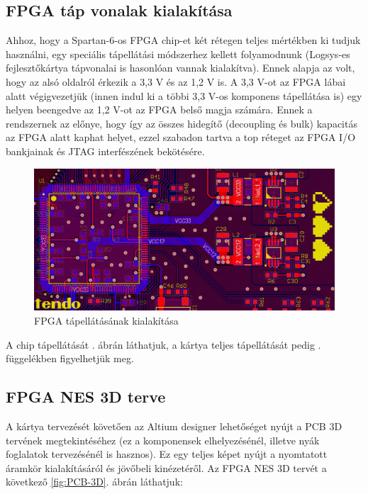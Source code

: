 	\subsection{FPGA táp vonalak kialakítása}
	
	Ahhoz, hogy a Spartan-6-os FPGA chip-et két rétegen teljes mértékben ki tudjuk használni, egy speciális tápellátási módszerhez kellett folyamodnunk (Logsys-es fejlesztőkártya tápvonalai is hasonlóan vannak kialakítva). Ennek alapja az volt, hogy az alsó oldalról érkezik a 3,3 V és az 1,2 V is. A 3,3 V-ot az FPGA lábai alatt végigvezetjük (innen indul ki a többi 3,3 V-os komponens tápellátása is) egy helyen beengedve az 1,2 V-ot az FPGA belső magja számára. Ennek a rendszernek az előnye, hogy így az összes hidegítő (decoupling és bulk) kapacitás az FPGA alatt kaphat helyet, ezzel szabadon tartva a top réteget az FPGA I/O bankjainak és JTAG interfészének bekötésére.
	
	\begin{figure}[H]
		\centering
		\includegraphics[width=150mm, keepaspectratio]{figures/FPGA-PSU-routing}
		\caption{FPGA tápellátásának kialakítása}
		\label{fig:FPGA-PSU-routing}
	\end{figure}
	
	A chip tápellátását . ábrán láthatjuk, a kártya teljes tápellátását pedig . függelékben figyelhetjük meg. 
	
	\subsection{FPGA NES 3D terve}
	
	A kártya tervezését követően az Altium designer lehetőséget nyújt a PCB 3D tervének megtekintéséhez (ez a komponensek elhelyezésénél, illetve nyák foglalatok tervezésénél is hasznos). Ez egy teljes képet nyújt a nyomtatott áramkör kialakításáról és jövőbeli kinézetéről. Az FPGA NES 3D tervét a következő \ref{fig:PCB-3D}. ábrán láthatjuk:  
	
